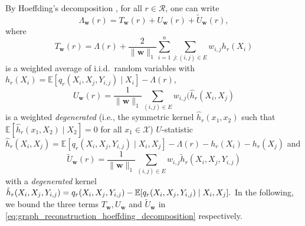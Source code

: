 \documentclass[letterpaper]{article} %
\newcommand{\E}{\mathbb{E}}
\newcommand{\weight}{\mathbf{w}}
\newcommand{\xspace}{\mathcal{X}}
\newcommand{\pair}[1]{(#1)}
\newcommand{\normo}[1]{\|#1\|_1}
\newcommand{\red}[1]{\textcolor{red}{#1}}
\newcommand{\todo}[1]{\red{\textsc{todo:} #1}}
\begin{document}
By Hoeffding's decomposition \cite{hoeffding1948class}, for all $r\in\mathcal R$, one can write
\begin{equation}
    \label{eq:graph_reconstruction_hoeffding_decomposition}
    \Lambda_\weight{}(r) = T_\weight{}(r) + U_\weight{}(r) + \widetilde{U}_\weight{}(r),
\end{equation}
where
\[T_\weight{}(r)=\Lambda(r)+\frac{2}{\normo{\weight{}}}\sum_{i=1}^n\sum_{j:\pair{i,j}\in E}w_{i,j}h_r(X_i)\]
is a weighted average of i.i.d.\ random variables with $h_r(X_i)=\E[q_r(X_i,X_j,Y_{i,j})\mid X_i]-\Lambda(r)$,
\[U_\weight{}(r)=\frac{1}{\normo{\weight{}}}\sum_{\pair{i,j}\in E} w_{i,j}(\hat{h}_r(X_i,X_j)\]
is a weighted \emph{degenerated} (i.e., the symmetric kernel $\hat{h}_r(x_1,x_2)$ such that $\E[\hat{h}_r(x_1, X_2)\mid X_2]=0$ for all $x_1\in\xspace{}$) $U$-statistic 
$\hat{h}_r(X_i,X_j)=\E[q_r(X_i,X_j,Y_{i,j})\mid X_i,X_j]-\Lambda(r)-h_r(X_i)-h_r(X_j)$ 
and
\[\widetilde{U}_\weight{}(r)=\frac{1}{\normo{\weight{}}}\sum_{\pair{i,j}\in E}w_{i,j}\tilde{h}_r(X_i,X_j,Y_{i,j})\]
with a \emph{degenerated} kernel 
$\tilde{h}_r(X_i,X_j,Y_{i,j})=q_r(X_i,X_j\linebreak,Y_{i,j})-\E[q_r(X_i,X_j,Y_{i,j})\mid X_i,X_j].$ 
In the following, we bound the three terms $T_\weight{}, U_\weight{}$ and $\widetilde{U}_\weight{}$ in \eqref{eq:graph_reconstruction_hoeffding_decomposition} respectively. 

\end{document}

